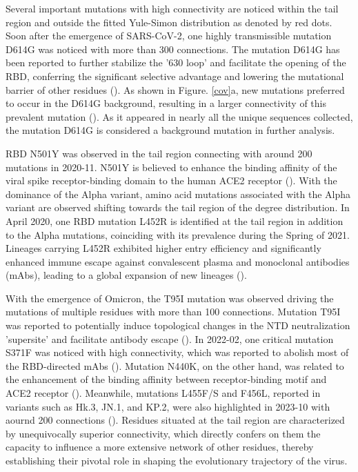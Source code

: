 \documentclass{sysbio}%
\begin{document}
Several important mutations with high connectivity are noticed within the tail region and outside the fitted Yule-Simon distribution as denoted by red dots. Soon after the emergence of SARS-CoV-2, one highly transmissible mutation D614G was noticed with more than 300 connections. The mutation D614G has been reported to further stabilize the '630 loop' and facilitate the opening of the RBD, conferring the significant selective advantage and lowering the mutational barrier of other residues (\cite{614}). As shown in Figure. \ref{cov}a, new mutations preferred to occur in the D614G background, resulting in a larger connectivity of this prevalent mutation (\cite{compliciyt_rate}). As it appeared in nearly all the unique sequences collected, the mutation D614G is considered a background mutation in further analysis.

RBD N501Y was observed in the tail region connecting with around 200 mutations in 2020-11. N501Y is believed to enhance the binding affinity of the viral spike receptor-binding domain to the human ACE2 receptor (\cite{N501Y_enhance_trans, N501Y_lineage, N501Y_binding}). With the dominance of the Alpha variant, amino acid mutations associated with the Alpha variant are observed shifting towards the tail region of the degree distribution. In April 2020, one RBD mutation L452R is identified at the tail region in addition to the Alpha mutations, coinciding with its prevalence during the Spring of 2021. Lineages carrying L452R exhibited higher entry efficiency and significantly enhanced immune escape against convalescent plasma and monoclonal antibodies (mAbs), leading to a global expansion of new lineages (\cite{L452R_expansion,motozono2021sars_452}). %

With the emergence of Omicron, the T95I mutation was observed driving the mutations of multiple residues with more than 100 connections. Mutation T95I was reported to potentially induce topological changes in the NTD neutralization 'supersite' and facilitate antibody escape (\cite{95}). In 2022-02, one critical mutation S371F was noticed with high connectivity, which was reported to abolish most of the RBD-directed mAbs (\cite{371_L/Fai2022antibody}). Mutation N440K, on the other hand, was related to the enhancement of the binding affinity between receptor-binding motif and ACE2 receptor (\cite{440_str}). Meanwhile, mutations L455F/S and F456L, reported in variants such as Hk.3, JN.1, and KP.2, were also highlighted in 2023-10 with aournd 200 connections (\cite{kpkp3,31d}). %
Residues situated at the tail region are characterized by unequivocally superior connectivity, which directly confers on them the capacity to influence a more extensive network of other residues, thereby establishing their pivotal role in shaping the evolutionary trajectory of the virus. 
\end{document}
